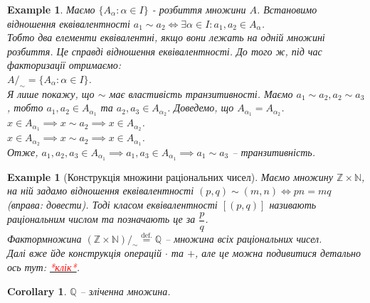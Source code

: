 \documentclass[a4paper, 14pt]{extarticle}
\theoremstyle{theoremdd}
\theoremstyle{theoremdd}
\theoremstyle{theoremdd}
\theoremstyle{theoremdd}
\theoremstyle{theoremdd}
\newtheorem{example}[theorem]{Example}
\theoremstyle{theoremdd}
\theoremstyle{theoremdd}
\theoremstyle{theoremdd}
\theoremstyle{theoremdd}
\theoremstyle{theoremdd}
\theoremstyle{theoremdd}
\theoremstyle{theoremdd}
\theoremstyle{theoremdd}
\theoremstyle{theoremdd}
\newtheorem{corollary}[theorem]{Corollary}
\theoremstyle{theoremdd}
\begin{document}
\begin{example}
Маємо $\{A_\alpha: \alpha \in I\}$ - розбиття множини $A$. Встановимо відношення еквівалентності $a_1 \sim a_2 \iff \exists \alpha \in I: a_1,a_2 \in A_\alpha$.\\
Тобто два елементи еквівалентні, якщо вони лежать на одній множині розбиття. Це справді відношення еквівалентності. До того ж, під час факторизації отримаємо:\\
$A/_{\sim} = \{A_\alpha : \alpha \in I\}$.
\bigskip \\
Я лише покажу, що $\sim$ має властивість транзитивності. Маємо $a_1 \sim a_2, a_2 \sim a_3$, тобто $a_1,a_2 \in A_{\alpha_1}$ та $a_2, a_3 \in A_{\alpha_2}$. Доведемо, що $A_{\alpha_1} = A_{\alpha_2}$.\\
$x \in A_{\alpha_1} \implies x \sim a_2 \implies x \in A_{\alpha_2}$.\\
$x \in A_{\alpha_2} \implies x \sim a_2 \implies x \in A_{\alpha_1}$.\\
Отже, $a_1,a_2,a_3 \in A_{\alpha_1} \implies a_1,a_3 \in A_{\alpha_1} \implies a_1 \sim a_3$ -- транзитивність.
\iffalse
\bigskip \\
Покажемо, що $A/_{\sim} = \{A_\alpha: \alpha \in I\}$.\\
Зауважимо, що $[a] = \{y \in A: y \sim a\} = \{y \in A: y \in A_{\alpha_0}\} = A_{\alpha_0}$.\\
$x \in A/_{\sim} \iff x = [a] = A_{\alpha_0} \iff x \in \{A_{\alpha}: \alpha \in I\}$.
\fi
\end{example}

\begin{example}[Конструкція множини раціональних чисел]
Маємо множину $\mathbb{Z} \times \mathbb{N}$, на ній задамо відношення еквівалентності $(p,q) \sim (m,n) \iff pn = mq$ (вправа: довести). Тоді класом еквівалентності $[(p,q)]$ називають раціональним числом та позначають це за $\dfrac{p}{q}$.\\
Фактормножина $(\mathbb{Z} \times \mathbb{N})/_\sim \overset{\text{def.}}{=} \mathbb{Q}$ -- множина всіх раціональних чисел.\\
Далі вже йде конструкція операцій $\cdot$ та $+$, але це можна подивитися детально ось тут: \href{http://mathfoundations.lti.cs.cmu.edu/class2/rationals.html#:~:text=Constructing%20the%20Rationals,the%20set%20containing%20only%20zero).}{\textcolor{red}{*клік*}}.
\end{example}


\begin{corollary}
$\mathbb{Q}$ -- зліченна множина.
\end{corollary}
\end{document}
